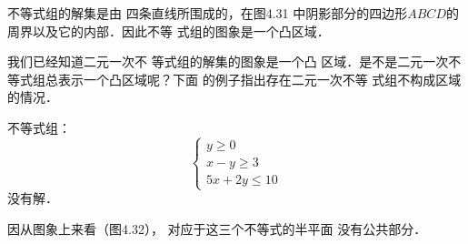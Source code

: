 \begin{solution}
不等式组的解集是由
四条直线所围成的，在图4.31
中阴影部分的四边形$ABCD$的
周界以及它的内部．因此不等
式组的图象是一个凸区域．
\end{solution}

我们已经知道二元一次不
等式组的解集的图象是一个凸
区域．是不是二元一次不等式组总表示一个凸区域呢？下面
的例子指出存在二元一次不等
式组不构成区域的情况．

\begin{example}
   不等式组：
   \[\begin{cases}
    y\ge 0\\
    x-y\ge 3\\
    5x+2y\le 10    
   \end{cases}\]
没有解． 
\end{example}

\begin{solution}
    因从图象上来看（图4.32），
对应于这三个不等式的半平面
没有公共部分．


\end{solution}

